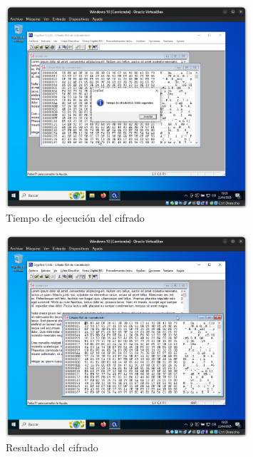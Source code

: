 \begin{figure}[H]
    \centering
    \includegraphics[width=0.8\textwidth]{EncriptadoRSA-2}
    \caption{Tiempo de ejecución del cifrado}
    \label{fig:RSA-ciph-time}
\end{figure}

\begin{figure}[H]
    \centering
    \includegraphics[width=0.8\textwidth]{EncriptadoRSA-3}
    \caption{Resultado del cifrado}
    \label{fig:RSA-ciph}
\end{figure}

